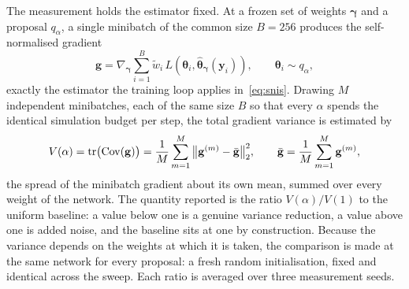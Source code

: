The measurement holds the estimator fixed. At a frozen set of weights
$\bm{\gamma}$ and a proposal $q_{\alpha}$, a single minibatch of the common size
$B = 256$ produces the self-normalised gradient
%
\begin{equation}
  \mathbf{g}
  = \nabla_{\bm{\gamma}} \sum_{i=1}^{B} \tilde{w}_i\,
      L(\bm{\theta}_i, \hat{\bm{\theta}}_{\bm{\gamma}}(\mathbf{y}_i)),
  \qquad \bm{\theta}_i \sim q_{\alpha},
  \label{eq:grad-est}
\end{equation}
%
exactly the estimator the training loop applies in~\eqref{eq:snis}. Drawing $M$
independent minibatches, each of the same size $B$ so that every $\alpha$ spends
the identical simulation budget per step, the total gradient variance is
estimated by
%
\begin{equation}
  V(\alpha)
  = \operatorname{tr}\bigl(\operatorname{Cov}(\mathbf{g})\bigr)
  = \frac{1}{M} \sum_{m=1}^{M}
      \big\lVert \mathbf{g}^{(m)} - \bar{\mathbf{g}} \big\rVert_2^2,
  \qquad
  \bar{\mathbf{g}} = \frac{1}{M} \sum_{m=1}^{M} \mathbf{g}^{(m)},
  \label{eq:grad-var}
\end{equation}
%
the spread of the minibatch gradient about its own mean, summed over every weight
of the network. The quantity reported is the ratio $V(\alpha)/V(1)$ to the
uniform baseline: a value below one is a genuine variance reduction, a value
above one is added noise, and the baseline sits at one by construction. Because
the variance depends on the weights at which it is taken, the comparison is made
at the same network for every proposal: a fresh random initialisation, fixed and
identical across the sweep. Each ratio is averaged over three measurement seeds.

